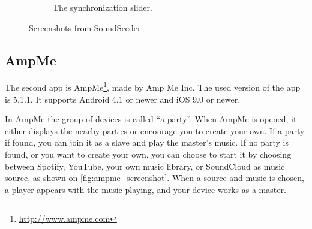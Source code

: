 \begin{figure}[h!]
\begin{subfigure}[b]{0.45\textwidth}
        \caption{The synchronization slider.}\label{fig:soundseeder_slider}
    \end{subfigure}
    \caption{Screenshots from SoundSeeder}\label{fig:soundseeder_screenshots}
\end{figure}

\subsection{AmpMe}\label{subsec:ampme}
The second app is AmpMe\footnote{\url{http://www.ampme.com}}, made by Amp Me Inc.
The used version of the app is 5.1.1.
It supports Android 4.1 or newer and iOS 9.0 or newer.

In AmpMe the group of devices is called ``a party''.
When AmpMe is opened, it either displays the nearby parties or encourage you to create your own.
If a party if found, you can join it as a slave and play the master's music.
If no party is found, or you want to create your own, you can choose to start it by choosing between Spotify,
YouTube, your own music library, or SoundCloud as music source, as shown on \cref{fig:ampme_screenshot}.
When a source and music is chosen, a player appears with the music playing,
and your device works as a master.

